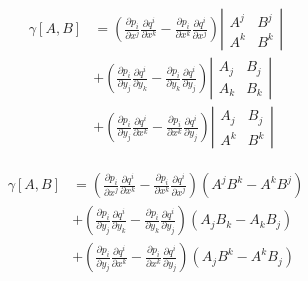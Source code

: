 \documentclass[a4paper,10pt]{article}
\numberwithin{equation}{section}
\begin{document}
\begin{align}
\begin{split}
 \gamma[A,B] &= \left(\frac{\partial p_i}{\partial x^j}\frac{\partial q^i}{\partial x^k} 
 - \frac{\partial p_i}{\partial x^k}\frac{\partial q^i}{\partial x^j}\right)\left|\begin{matrix}
                                                                             A^j & B^j \\
                                                                             A^k & B^k
                                                                            \end{matrix}\right| \\
 &+ \left(\frac{\partial p_i}{\partial y_j}\frac{\partial q^i}{\partial y_k} 
 - \frac{\partial p_i}{\partial y_k}\frac{\partial q^i}{\partial y_j}\right)\left|\begin{matrix}
                                                                             A_j & B_j \\
                                                                             A_k & B_k
                                                                            \end{matrix}\right| \\
 &+ \left(\frac{\partial p_i}{\partial y_j}\frac{\partial q^i}{\partial x^k} 
 - \frac{\partial p_i}{\partial x^k}\frac{\partial q^i}{\partial y_j}\right)\left|\begin{matrix}
                                                                             A_j & B_j \\
                                                                             A^k & B^k
                                                                            \end{matrix}\right|
\end{split}
\end{align}

\begin{align}
 \gamma[A,B] &= \left(\frac{\partial p_i}{\partial x^j}\frac{\partial q^i}{\partial x^k} 
 - \frac{\partial p_i}{\partial x^k}\frac{\partial q^i}{\partial x^j}\right)(A^jB^k - A^kB^j) \\
 &+ \left(\frac{\partial p_i}{\partial y_j}\frac{\partial q^i}{\partial y_k} 
 - \frac{\partial p_i}{\partial y_k}\frac{\partial q^i}{\partial y_j}\right)(A_jB_k - A_kB_j) \\
 &+  \left(\frac{\partial p_i}{\partial y_j}\frac{\partial q^i}{\partial x^k} 
 - \frac{\partial p_i}{\partial x^k}\frac{\partial q^i}{\partial y_j}\right)(A_jB^k - A^kB_j)
\end{align}
\end{document}
